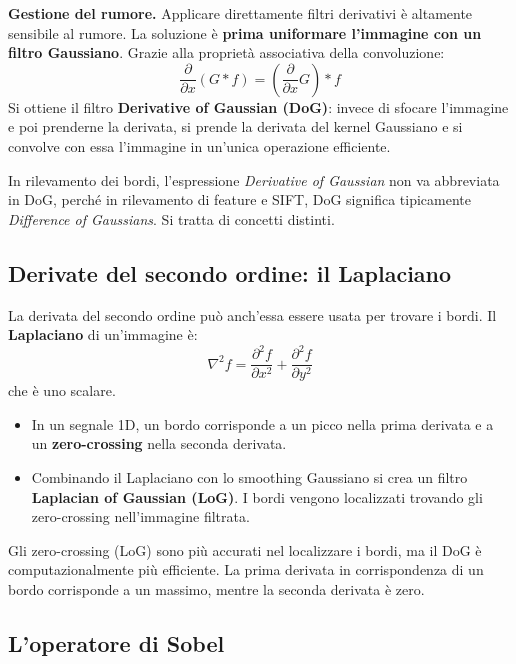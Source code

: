 \documentclass[12pt, a4paper]{report}
\begin{document}
\textbf{Gestione del rumore.}  Applicare direttamente filtri derivativi è
altamente sensibile al rumore.  La soluzione è \textbf{prima uniformare l'immagine
con un filtro Gaussiano}.  Grazie alla proprietà associativa della convoluzione:
\[
  \frac{\partial}{\partial x}(G * f)
  = \left(\frac{\partial}{\partial x}G\right) * f
\]
Si ottiene il filtro \textbf{Derivative of Gaussian (DoG)}: invece di sfocare
l'immagine e poi prenderne la derivata, si prende la derivata del kernel Gaussiano
e si convolve con essa l'immagine in un'unica operazione efficiente.

\begin{warnbox}
In rilevamento dei bordi, l'espressione \emph{Derivative of Gaussian} non va
abbreviata in DoG, perché in rilevamento di feature e SIFT, DoG significa
tipicamente \emph{Difference of Gaussians}.  Si tratta di concetti distinti.
\end{warnbox}

\subsection{Derivate del secondo ordine: il Laplaciano}

La derivata del secondo ordine può anch'essa essere usata per trovare i bordi.
Il \textbf{Laplaciano} di un'immagine è:
\[
  \nabla^2 f = \frac{\partial^2 f}{\partial x^2} + \frac{\partial^2 f}{\partial y^2}
\]
che è uno scalare.

\begin{itemize}
  \item In un segnale 1D, un bordo corrisponde a un picco nella prima derivata e a
        un \textbf{zero-crossing} nella seconda derivata.
  \item Combinando il Laplaciano con lo smoothing Gaussiano si crea un filtro
        \textbf{Laplacian of Gaussian (LoG)}.  I bordi vengono localizzati trovando
        gli zero-crossing nell'immagine filtrata.
\end{itemize}

\begin{notebox}
Gli zero-crossing (LoG) sono più accurati nel localizzare i bordi, ma il DoG è
computazionalmente più efficiente.  La prima derivata in corrispondenza di un bordo
corrisponde a un massimo, mentre la seconda derivata è zero.
\end{notebox}

\subsection{L'operatore di Sobel}
\end{document}
